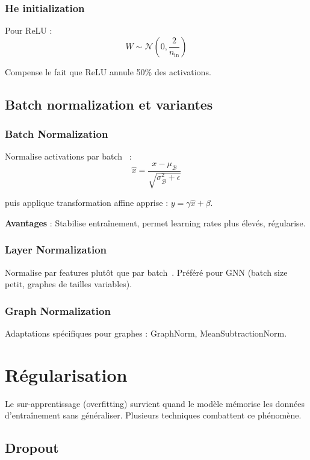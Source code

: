 \subsubsection{He initialization}

Pour ReLU :
\[
W \sim \mathcal{N}\left(0, \frac{2}{n_{\text{in}}}\right)
\]

Compense le fait que ReLU annule 50\% des activations.

\subsection{Batch normalization et variantes}

\subsubsection{Batch Normalization}

Normalise activations par batch~\cite{Ioffe2015} :
\[
\hat{x} = \frac{x - \mu_\mathcal{B}}{\sqrt{\sigma_\mathcal{B}^2 + \epsilon}}
\]

puis applique transformation affine apprise : $y = \gamma \hat{x} + \beta$.

\textbf{Avantages} : Stabilise entraînement, permet learning rates plus élevés, régularise.

\subsubsection{Layer Normalization}

Normalise par features plutôt que par batch~\cite{Ba2016}. Préféré pour GNN (batch size petit, graphes de tailles variables).

\subsubsection{Graph Normalization}

Adaptations spécifiques pour graphes : GraphNorm, MeanSubtractionNorm.

\section{Régularisation}

Le sur-apprentissage (overfitting) survient quand le modèle mémorise les données d'entraînement sans généraliser. Plusieurs techniques combattent ce phénomène.

\subsection{Dropout}

